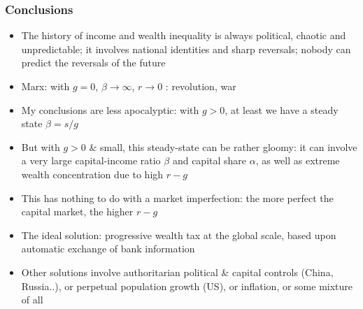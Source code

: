 \documentclass[t]{beamer}\usepackage[]{graphicx}\usepackage[]{color}
\begin{document}
\begin{frame}[label=Conclusions_1,shrink=7]
\frametitle{Conclusions}
\begin{itemize}
\item
The history of income and wealth inequality is always political, chaotic and unpredictable; it involves national identities and sharp reversals; nobody can predict the reversals of the future
\item
Marx: with $g=0$, $\beta\rightarrow\infty$, $r\rightarrow 0$ : revolution, war
\item
My conclusions are less apocalyptic: with $g>0$, at least we have a steady state $\beta=s/g$
\item
But with $g>0$ \& small, this steady-state can be rather gloomy: it can involve a very large capital-income ratio $\beta$ and capital share $\alpha$, as well as extreme wealth concentration due to high $r-g$
\item
This has nothing to do with a market imperfection: the more perfect the capital market, the higher $r-g$
\item
The ideal solution: progressive wealth tax at the global scale, based upon automatic exchange of bank information
\item
Other solutions involve authoritarian political \& capital controls (China, Russia..), or perpetual population growth (US), or inflation, or some mixture of all
\end{itemize}
\end{frame}
\end{document}
